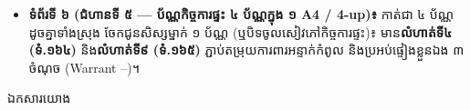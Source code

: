 \documentclass[a4paper,12pt]{article}
\newcommand{\en}[1]{{\TimesEn #1}}
\newcommand{\unit}[1]{\,\text{\en{#1}}}
\newcommand{\cnum}[1]{\text{\fontsize{10.5pt}{12pt}\selectfont\ding{\numexpr181+#1\relax}}}
\newcommand{\tri}[1]{\ensuremath{\triangle #1}}
\newcommand{\cg}{\ensuremath{\cong}}
\newcommand{\refbanner}[1]{%
  \needspace{2.2cm}%
  \vspace{2pt}%
  \begin{tcolorbox}[
    enhanced, sharp corners, colback=stepgray, colframe=black,
    boxrule=1.1pt, borderline south={0.6pt}{1.8pt}{black},
    top=5pt, bottom=5pt, left=9pt, right=9pt,
    before skip=6pt, after skip=5pt
  ]
    {\muol\fontsize{12pt}{19pt}\selectfont #1}%
  \end{tcolorbox}%
}
\begin{document}
\begin{itemize}[leftmargin=0.55cm, topsep=1pt, itemsep=1.5pt, parsep=0pt]
    កាត់ផ្ដាច់បន្ទះចម្លើយគ្រូខាងក្រោមចេញមុនលើកបង្ហាញ! ចម្លើយគោល៖ \textbf{កាត \en{A}} = មេដៃឡើង  (ជ.ជ.ជ បង្វិល-ឆ្លុះ $\approx 135^\circ$); \textbf{កាត \en{B}} = ខ្វែងដៃ  (អន្ទាក់ ម.ម.ម $60^\circ$: $4\unit{cm} \neq 6\unit{cm}$); \textbf{កាត \en{C}} = ខ្វែងដៃ  ($FJ=GK$ ខ្វះស្ពាន $JG$ និងជ្រុងទី ៣); \textbf{កាត \en{D}} = ខ្វែងដៃ  (លំដាប់កំពូលខុស $\tri{ABC}\cg\tri{BDC}$, ត្រូវសរសេរ $\tri{ABC}\cg\tri{DCB}$!)។ ប្រើសញ្ញាម្រាម \en{1--3} កែភ្លាម ១៥ វិនាទី។
  \item \textbf{ទំព័រទី ៦ (ជំហានទី ៥ — ប័ណ្ណកិច្ចការផ្ទះ ៤ ប័ណ្ណក្នុង ១ \en{A4 / 4-up})៖}
    កាត់ជា ៤ ប័ណ្ណដូចគ្នាទាំងស្រុង ចែកជូនសិស្សម្នាក់ ១ ប័ណ្ណ (ឬបិទចូលសៀវភៅកិច្ចការផ្ទះ)៖ មាន\textbf{លំហាត់ទី៤ (ទំ.១៦៤)} និង\textbf{លំហាត់ទី៩ (ទំ.១៦៥)} ភ្ជាប់តម្រុយការពារអន្ទាក់កំពូល និងប្រអប់ផ្ទៀងខ្លួនឯង ៣ ចំណុច (\en{Warrant} \cnum{1}--\cnum{5})។
\end{itemize}

\refbanner{ឯកសារយោង}
\end{document}
